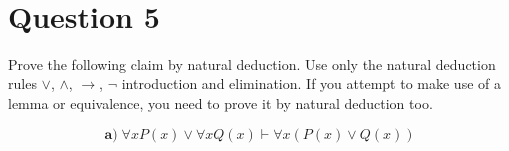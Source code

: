 \documentclass[a4paper,12pt]{article}
\newcommand\tab[1][1cm]{\hspace*{#1}}
\begin{document}
\begin{tcolorbox}
\begin{table}[H]
\begin{tabular}{*6{l}}
\end{tabular}
\end{table}
\end{tcolorbox}\\\\\\\\\\\\\\\\\\\\\\\\\\\\\\\\\\\\\\\\\\\\\

\section*{Question 5 \hfill {}}
\tab Prove the following claim by natural deduction. Use only the natural deduction rules $\vee$, $\wedge$, $\rightarrow$, $\neg$ introduction and elimination. If you attempt to make use of a lemma or equivalence, you need to prove it by natural deduction too.


\begin{equation*}
    \textbf{a)} \; \forall x P(x) \vee \forall x Q(x) \vdash \forall x (P(x) \vee Q(x)) 
\end{equation*}
\end{document}
